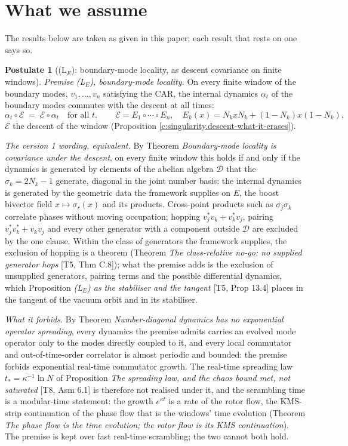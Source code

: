 \documentclass[11pt]{article}
\theoremstyle{definition}
\newtheorem{postulate}[theorem]{Postulate}
\theoremstyle{plain}
\begin{document}
\section*{What we assume}
The results below are taken as given in this paper; each result that rests on one says so.
\begin{postulate}[(L$_E$): boundary-mode locality, as descent covariance on finite windows]\label{c:singularity.l-boundary-mode-locality}
\emph{Premise (L$_{E}$), boundary-mode locality.} On every finite window of the boundary modes, $v_{1}, \dots, v_{n}$ satisfying the CAR, the internal dynamics $\alpha_{t}$ of the boundary modes commutes with the descent at all times:
\[
\alpha_{t}\circ\mathcal{E} \;=\; \mathcal{E}\circ\alpha_{t} \quad \text{for all } t, \qquad \mathcal{E} = E_{1}\circ\cdots\circ E_{n}, \quad E_{k}(x) = N_{k}xN_{k} + (1 - N_{k})x(1 - N_{k}),
\]
$\mathcal{E}$ the descent of the window (Proposition \ref{c:singularity.descent-what-it-erases}).

\emph{The version 1 wording, equivalent.} By Theorem \emph{Boundary-mode locality is covariance under the descent}, on every finite window this holds if and only if the dynamics is generated by elements of the abelian algebra $\mathcal{D}$ that the $\sigma_{k} = 2N_{k} - 1$ generate, diagonal in the joint number basis: the internal dynamics is generated by the geometric data the framework supplies on $E$, the boost bivector field $x \mapsto \sigma_{r}(x)$ and its products. Cross-point products such as $\sigma_{j}\sigma_{k}$ correlate phases without moving occupation; hopping $v_{j}^{*}v_{k} + v_{k}^{*}v_{j}$, pairing $v_{j}^{*}v_{k}^{*} + v_{k}v_{j}$ and every other generator with a component outside $\mathcal{D}$ are excluded by the one clause. Within the class of generators the framework supplies, the exclusion of hopping is a theorem (Theorem \emph{The class-relative no-go: no supplied generator hops} [T5, Thm C.8]); what the premise adds is the exclusion of unsupplied generators, pairing terms and the possible differential dynamics, which Proposition \emph{(L$_E$) as the stabiliser and the tangent} [T5, Prop 13.4] places in the tangent of the vacuum orbit and in its stabiliser.

\emph{What it forbids.} By Theorem \emph{Number-diagonal dynamics has no exponential operator spreading}, every dynamics the premise admits carries an evolved mode operator only to the modes directly coupled to it, and every local commutator and out-of-time-order correlator is almost periodic and bounded: the premise forbids exponential real-time commutator growth. The real-time spreading law $t_{*} = \kappa^{-1}\ln N$ of Proposition \emph{The spreading law, and the chaos bound met, not saturated} [T8, Asm 6.1] is therefore not realised under it, and the scrambling time is a modular-time statement: the growth $e^{\kappa t}$ is a rate of the rotor flow, the KMS-strip continuation of the phase flow that is the windows' time evolution (Theorem \emph{The phase flow is the time evolution; the rotor flow is its KMS continuation}). The premise is kept over fast real-time scrambling; the two cannot both hold.
\end{postulate}
\end{document}

